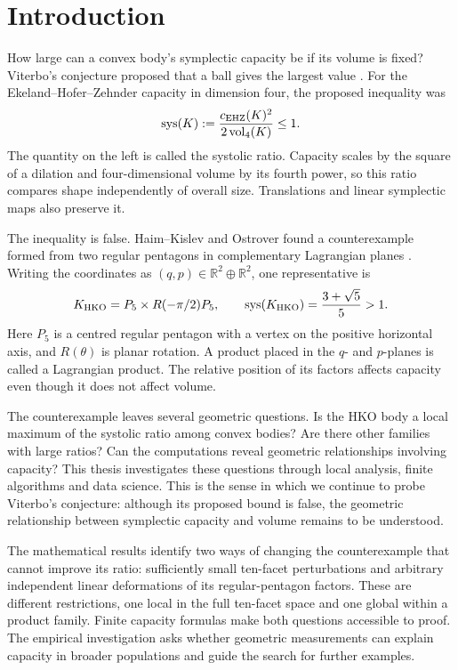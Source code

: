 \section{Introduction}\label{sec:introduction}

How large can a convex body's symplectic capacity be if its volume is fixed?
Viterbo's conjecture proposed that a ball gives the largest value
\cite{Viterbo2000}. For the Ekeland--Hofer--Zehnder capacity in dimension
four, the proposed inequality was
\[
 \operatorname{sys}(K):=\frac{c_{\rm EHZ}(K)^2}{2\operatorname{vol}_4(K)}\leq1.
\]
The quantity on the left is called the systolic ratio. Capacity scales by
the square of a dilation and four-dimensional volume by its fourth power,
so this ratio compares shape independently of overall size. Translations
and linear symplectic maps also preserve it.

The inequality is false. Haim--Kislev and Ostrover found a counterexample
formed from two regular pentagons in complementary Lagrangian planes
\cite{HaimKislevOstrover2024}. Writing the coordinates as $(q,p)\in
\mathbb R^2\oplus\mathbb R^2$, one representative is
\[
 K_{\rm HKO}=P_5\times R(-\pi/2)P_5,\qquad
 \operatorname{sys}(K_{\rm HKO})=\frac{3+\sqrt5}{5}>1.
\]
Here $P_5$ is a centred regular pentagon with a vertex on the positive
horizontal axis, and $R(\theta)$ is planar rotation. A product placed in
the $q$- and $p$-planes is called a Lagrangian product. The relative
position of its factors affects capacity even though it does not affect
volume.

The counterexample leaves several geometric questions. Is the HKO body a
local maximum of the systolic ratio among convex bodies? Are there other
families with large ratios? Can the
computations reveal geometric relationships involving capacity? This thesis
investigates these questions through local analysis, finite algorithms and
data science. This is the sense in which we continue to probe Viterbo's
conjecture: although its proposed bound is false, the geometric relationship
between symplectic capacity and volume remains to be understood.

The mathematical results identify two ways of changing the counterexample
that cannot improve its ratio: sufficiently small ten-facet perturbations
and arbitrary independent linear deformations of its regular-pentagon
factors. These are different restrictions, one local in the full ten-facet
space and one global within a product family. Finite capacity formulas make
both questions accessible to proof. The empirical investigation asks whether
geometric measurements can explain capacity in broader populations and guide
the search for further examples.

